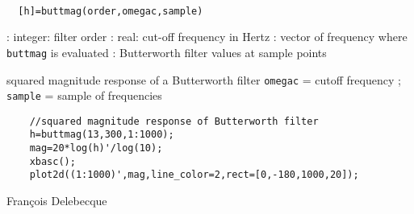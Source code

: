 
\begin{mandesc}
   \\ %
\end{mandesc}
\begin{calling_sequence}
\begin{verbatim}
  [h]=buttmag(order,omegac,sample)  
\end{verbatim}
\end{calling_sequence}
\begin{parameters}
  \begin{varlist}
    : integer: filter order
    : real: cut-off frequency in Hertz
    : vector of frequency where \verb!buttmag! is evaluated
    : Butterworth filter values at sample points
  \end{varlist}
\end{parameters}
\begin{mandescription}
  squared magnitude response of a Butterworth filter
  \verb!omegac! = cutoff frequency ; \verb!sample! = sample of frequencies
\end{mandescription}
\begin{examples}
  \begin{Verbatim}
    //squared magnitude response of Butterworth filter
    h=buttmag(13,300,1:1000);
    mag=20*log(h)'/log(10);
    xbasc();
    plot2d((1:1000)',mag,line_color=2,rect=[0,-180,1000,20]);
  \end{Verbatim}
\end{examples}
\begin{authors}
  Fran\c{c}ois  Delebecque  
\end{authors}
